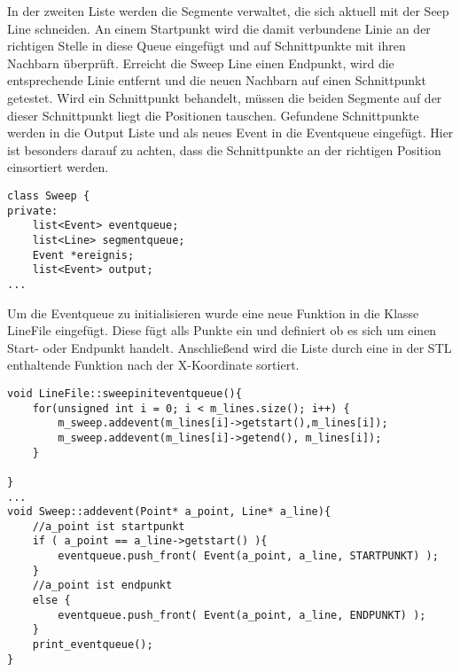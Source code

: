 In der zweiten Liste werden die Segmente verwaltet, die sich aktuell mit der Seep Line schneiden. An einem Startpunkt wird die damit verbundene Linie an der richtigen Stelle in diese Queue eingefügt und auf Schnittpunkte mit ihren Nachbarn überprüft. Erreicht die Sweep Line einen Endpunkt, wird die entsprechende Linie entfernt und die neuen Nachbarn auf einen Schnittpunkt getestet. Wird ein Schnittpunkt behandelt, müssen die beiden Segmente auf der dieser Schnittpunkt liegt die Positionen tauschen. Gefundene Schnittpunkte werden in die Output Liste und als neues Event in die Eventqueue eingefügt. Hier ist besonders darauf zu achten, dass die Schnittpunkte an der richtigen Position einsortiert werden.
\begin{lstlisting}[captionpos=b, caption={Attribute der Klasse Sweep}, label=A3:Sweeppriv]
class Sweep {
private:
	list<Event> eventqueue;
	list<Line> segmentqueue;
	Event *ereignis;
	list<Event> output;
...
\end{lstlisting}

Um die Eventqueue zu initialisieren wurde eine neue Funktion in die Klasse LineFile eingefügt. Diese fügt alls Punkte ein und definiert ob es sich um einen Start- oder Endpunkt handelt. Anschließend wird die Liste durch eine in der STL enthaltende Funktion nach der X-Koordinate sortiert.
\begin{lstlisting}[captionpos=b, caption={Initialisierung der Sweep Line}, label=A3:Sweepinit]
void LineFile::sweepiniteventqueue(){
	for(unsigned int i = 0; i < m_lines.size(); i++) {
		m_sweep.addevent(m_lines[i]->getstart(),m_lines[i]);
		m_sweep.addevent(m_lines[i]->getend(), m_lines[i]);
	}

}
...
void Sweep::addevent(Point* a_point, Line* a_line){
	//a_point ist startpunkt
	if ( a_point == a_line->getstart() ){
		eventqueue.push_front( Event(a_point, a_line, STARTPUNKT) );
	}
	//a_point ist endpunkt
	else {
		eventqueue.push_front( Event(a_point, a_line, ENDPUNKT) );
	}
	print_eventqueue();
}
\end{lstlisting}



